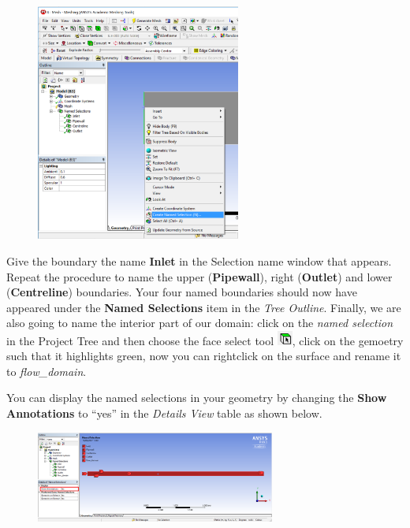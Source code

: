 \documentclass[11pt,a4paper,oneside,hidelinks]{scrartcl}
\newcommand\bfr[1]{\textcolor[rgb]{1,0.00,0.00}{\textbf{\textsf{#1}}}}
\begin{document}
\begin{figure}[H]
\begin{center}
\includegraphics[width=0.6\textwidth,clip]{create_named_selection.png}
\end{center}
\end{figure}

Give the boundary the name \bfr{Inlet} in the Selection name window that appears. Repeat the procedure to name the upper (\bfr{Pipewall}), right (\bfr{Outlet}) and lower (\bfr{Centreline}) boundaries. Your four named boundaries should now have appeared under the \bfr{Named Selections} item in the \emph{Tree Outline}. Finally, we are also going to name the interior part of our domain: click on the \emph{named selection} in the Project Tree and then choose the face select tool \includegraphics[width=0.5cm]{face_tool.png}, click on the gemoetry such that it highlights green, now you can rightclick on the surface and rename it to \emph{flow\_domain}.


You can display the named selections in your geometry by changing the \bfr{Show Annotations} to ``yes'' in the \emph{Details View} table as shown below.

\begin{figure}[H]
\begin{center}
\includegraphics[width=0.7\textwidth,clip]{named_selections.png}
\end{center}
\end{figure}
\end{document}
